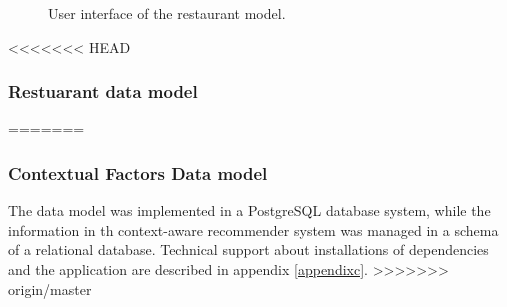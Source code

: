\begin{figure}
\captionsetup{justification=centering,margin=2cm,font=footnotesize}
\centering
\setlength\fboxsep{0pt}
\setlength\fboxrule{0.7pt}
\caption{User interface of the restaurant model.}
\label{fig:restaurantmodel}       
\end{figure}

<<<<<<< HEAD
\subsubsection{Restuarant data model} \label{datamodelsection}   
=======
\subsubsection{Contextual Factors Data model} \label{datamodelsection}   

The data model was implemented in a PostgreSQL database system, 
while the information in th context-aware recommender system was
managed in a schema of a relational database. Technical support 
about installations of dependencies and the application are 
described in appendix \ref{appendixc}.
>>>>>>> origin/master

